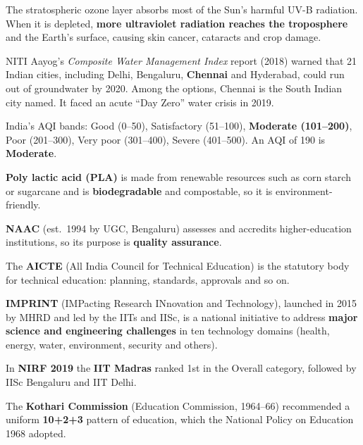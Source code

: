 The stratospheric ozone layer absorbs most of the Sun's harmful UV-B radiation. When it is depleted, \textbf{more ultraviolet radiation reaches the troposphere} and the Earth's surface, causing skin cancer, cataracts and crop damage.

NITI Aayog's \emph{Composite Water Management Index} report (2018) warned that 21 Indian cities, including Delhi, Bengaluru, \textbf{Chennai} and Hyderabad, could run out of groundwater by 2020. Among the options, Chennai is the South Indian city named. It faced an acute ``Day Zero'' water crisis in 2019.

India's AQI bands: Good (0--50), Satisfactory (51--100), \textbf{Moderate (101--200)}, Poor (201--300), Very poor (301--400), Severe (401--500). An AQI of 190 is \textbf{Moderate}.

\textbf{Poly lactic acid (PLA)} is made from renewable resources such as corn starch or sugarcane and is \textbf{biodegradable} and compostable, so it is environment-friendly.

\textbf{NAAC} (est.~1994 by UGC, Bengaluru) assesses and accredits higher-education institutions, so its purpose is \textbf{quality assurance}.

The \textbf{AICTE} (All India Council for Technical Education) is the statutory body for technical education: planning, standards, approvals and so on.

\textbf{IMPRINT} (IMPacting Research INnovation and Technology), launched in 2015 by MHRD and led by the IITs and IISc, is a national initiative to address \textbf{major science and engineering challenges} in ten technology domains (health, energy, water, environment, security and others).

In \textbf{NIRF 2019} the \textbf{IIT Madras} ranked 1st in the Overall category, followed by IISc Bengaluru and IIT Delhi.

The \textbf{Kothari Commission} (Education Commission, 1964--66) recommended a uniform \textbf{10+2+3} pattern of education, which the National Policy on Education 1968 adopted.
